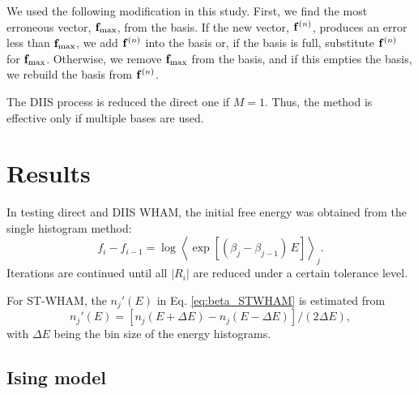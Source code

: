 \documentclass[reprint,superscriptaddress]{revtex4-1}
\begin{document}
We used the following modification
in this study.
%
%
%
%
First, we find the most erroneous vector,
$\mathbf{f}_\mathrm{max}$, from the basis.
%
If the new vector, $\mathbf{f}^{(n)}$,
produces an error less than $\mathbf{f}_\mathrm{max}$,
we add $\mathbf{f}^{(n)}$ into the basis
or, if the basis is full,
substitute $\mathbf{f}^{(n)}$ for $\mathbf{f}_\mathrm{max}$.
%
Otherwise,
we remove $\mathbf{f}_\mathrm{max}$ from the basis,
and if this empties the basis,
we rebuild the basis from $\mathbf{f}^{(n)}$.



The DIIS process is reduced the direct one
if $M = 1$.
%
Thus,
the method is effective
only if multiple bases are used.





\section{Results}





In testing direct and DIIS WHAM,
the initial free energy was obtained from
the single histogram method:
%
\begin{equation*}
f_i - f_{i-1}
=
\log
\left\langle
  \exp\left[
    (\beta_j - \beta_{j-1}) \, E
  \right]
\right\rangle_j.
\end{equation*}
%
Iterations are continued
until all $|R_i|$ are reduced under a certain tolerance level.



For ST-WHAM,
the $n_j'(E)$ in Eq. \eqref{eq:beta_STWHAM}
is estimated from
\begin{equation}
n_j'(E) = [n_j(E + \Delta E) - n_j(E - \Delta E)]/(2 \Delta E),
\label{eq:dn}
\end{equation}
with $\Delta E$ being the bin size
of the energy histograms.



\subsection{Ising model}
\end{document}
